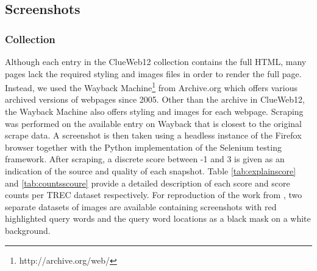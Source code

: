 \subsection{Screenshots} \label{sec:screenshotsec}



\subsubsection{Collection}
Although each entry in the ClueWeb12 collection contains the full HTML, many pages lack the required styling and images files in order to render the full page. Instead, we used the Wayback Machine\footnote{http://archive.org/web/} from Archive.org which offers various archived versions of webpages since 2005. Other than the archive in ClueWeb12, the Wayback Machine also offers styling and images for each webpage. Scraping was performed on the available entry on Wayback that is closest to the original scrape data. A screenshot is then taken using a headless instance of the Firefox browser together with the Python implementation of the Selenium testing framework. After scraping, a discrete score between -1 and 3 is given as an indication of the source and quality of each snapshot. Table \ref{tab:explainscore} and \ref{tab:countsscoure} provide a detailed description of each score and score counts per TREC dataset respectively.
For reproduction of the work from \citet{fan2017learning}, two separate datasets of images are available containing screenshots with red highlighted query words and the query word locations as a black mask on a white background. 

